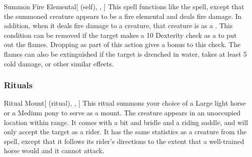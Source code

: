 \lowercase{\hypertarget{spell:Summon Fire Elemental}{}}\label{spell:Summon Fire Elemental}
\begin{attuneability}[Rank 6]{\hypertarget{spell:Summon Fire Elemental}{Summon Fire Elemental}}[ (self), , ]
This spell functions like the  spell, except that the summoned creature appears to be a fire elemental and deals fire damage.
In addition, when it deals fire damage to a creature, that creature is  as a .
This condition can be removed if the target makes a  10 Dexterity check as a  to put out the flames.
Dropping  as part of this action gives a  bonus to this check.
The flames can also be extinguished if the target is drenched in water, takes at least 5 cold damage, or other similar effects.
\end{attuneability}
\vspace{0.25em}



\subsubsection{Rituals}


\lowercase{\hypertarget{spell:Ritual Mount}{}}\label{spell:Ritual Mount}
\begin{attuneability}[Rank 3]{\hypertarget{spell:Ritual Mount}{Ritual Mount}}[ (ritual), , ]
This ritual summons your choice of a Large light horse or a Medium pony to serve as a mount.
The creature appears in an unoccupied location within \rngclose range.
It comes with a bit and bridle and a riding saddle, and will only accept the target as a rider.
It has the same statistics as a creature from the  spell, except that it follows its rider's directions to the extent that a well-trained horse would and it cannot attack.
\end{attuneability}
\vspace{0.25em}


